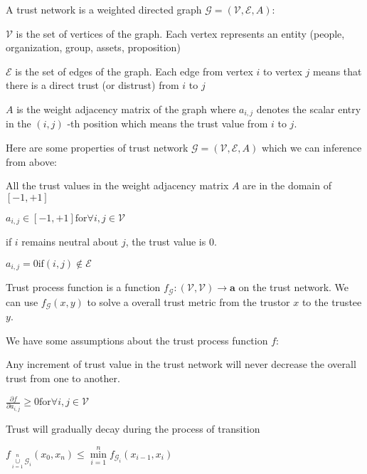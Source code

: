 \documentclass{article}
\begin{document}

A trust network is a weighted directed graph \(\mathcal{G}=(\mathcal{V},\mathcal{E},A)\):


\item \(\mathcal{V}\) is the set of vertices of the graph. Each vertex represents an entity (people, organization, group, assets, proposition)


\item \(\mathcal{E}\) is the set of edges of the graph. Each edge from vertex \(i\) to vertex \(j\) means that there is a direct trust (or distrust)
from \(i\) to \(j\)


\item \(A\) is the weight adjacency matrix of the graph where \(a_{i,j}\) denotes the scalar entry in the \((i,j)\) -th position which means the
trust value from \(i\) to \(j\).



Here are some properties of trust network \(\mathcal{G}=(\mathcal{V},\mathcal{E},A)\) which we can inference from above:

All the trust values in the weight adjacency matrix \(A\) are in the domain of \([-1,+1]\)

\(a_{i,j}\in [-1,+1] \text{for} \forall i,j\in \mathcal{V}\)

if \(i\) remains neutral about \(j\), the trust value is \(0\).

\(a_{i,j}=0 \text{if} (i,j)\notin \mathcal{E}\)



Trust process function is a function \(f_{\mathcal{G}}:(\mathcal{V},\mathcal{V})\to \mathbf{a}\) on the trust network. We can use \(f_{\mathcal{G}}(x,y)\)
to solve a overall trust metric from the trustor \(x\) to the trustee \(y\).



We have some assumptions about the trust process function \(f\):

Any increment of trust value in the trust network will never decrease the overall trust from one to another.

\(\frac{\partial f}{\partial a_{i,j}}\geqslant 0 \text{for} \forall i,j\in \mathcal{V}\)

Trust will gradually decay during the process of transition

\(f_{\underset{i=1}{\overset{n}{\cup }}\mathcal{G}_i}\left(x_0,x_n\right)\leq \underset{i=1}{\overset{n}{\min }}f_{\mathcal{G}_i}\left(x_{i-1},x_i\right)\)
\end{document}
